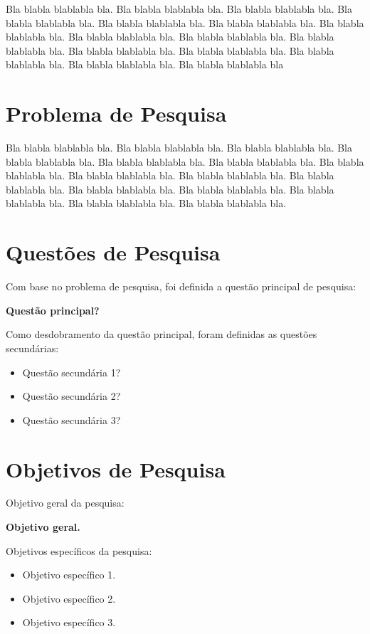 \documentclass[diss,capa,times,english]{ppgci}
\begin{document}
Bla blabla blablabla bla.  Bla blabla blablabla bla.  Bla blabla
blablabla bla.  Bla blabla blablabla bla.  Bla blabla blablabla bla.
Bla blabla blablabla bla.  Bla blabla blablabla bla.  Bla blabla
blablabla bla.  Bla blabla blablabla bla.  Bla blabla blablabla bla.
Bla blabla blablabla bla.  Bla blabla blablabla bla.  Bla blabla
blablabla bla.  Bla blabla blablabla bla.  Bla blabla blablabla bla

\section{Problema de Pesquisa} %

Bla blabla blablabla bla.  Bla blabla blablabla bla.  Bla blabla
blablabla bla.  Bla blabla blablabla bla.  Bla blabla blablabla bla.
Bla blabla blablabla bla.  Bla blabla blablabla bla.  Bla blabla
blablabla bla.  Bla blabla blablabla bla.  Bla blabla blablabla bla.
Bla blabla blablabla bla.  Bla blabla blablabla bla.  Bla blabla
blablabla bla.  Bla blabla blablabla bla.  Bla blabla blablabla bla.

\section{Questões de Pesquisa} %

Com base no problema de pesquisa, foi definida a questão principal de pesquisa:

\textbf{Questão principal?}

Como desdobramento da questão principal, foram definidas as questões secundárias: 

\begin{itemize}
    \item[i.] Questão secundária 1?
    \item[ii.] Questão secundária 2?
    \item[iii.] Questão secundária 3?
\end{itemize}

\section{Objetivos de Pesquisa} %

Objetivo geral da pesquisa:

\textbf{Objetivo geral.}

Objetivos específicos da pesquisa:

\begin{itemize}
    \item[i.] Objetivo específico 1.
    \item[ii.] Objetivo específico 2.
    \item[iii.] Objetivo específico 3.
\end{itemize}
\end{document}
